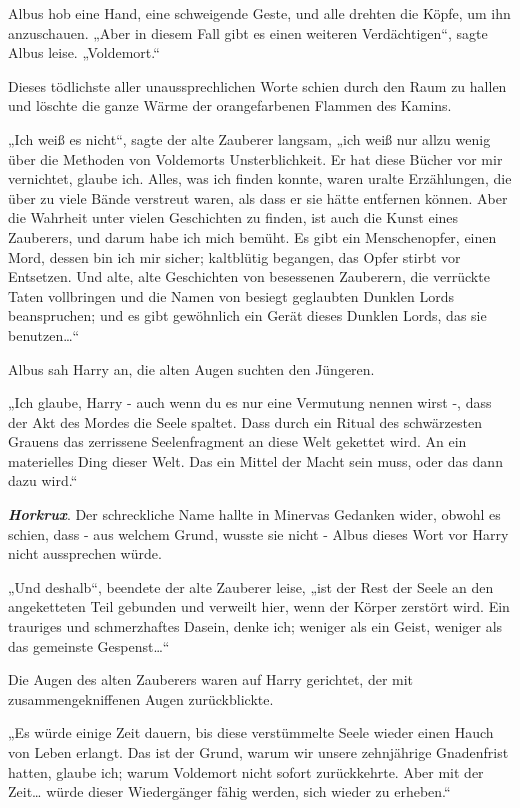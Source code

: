 {Albus hob eine Hand, eine schweigende Geste, und alle drehten die Köpfe, um ihn anzuschauen. „Aber in diesem Fall gibt es einen weiteren Verdächtigen“, sagte Albus leise. „Voldemort.“

Dieses tödlichste aller unaussprechlichen Worte schien durch den Raum zu hallen und löschte die ganze Wärme der orangefarbenen Flammen des Kamins.

„Ich weiß es nicht“, sagte der alte Zauberer langsam, „ich weiß nur allzu wenig über die Methoden von Voldemorts Unsterblichkeit. Er hat diese Bücher vor mir vernichtet, glaube ich. Alles, was ich finden konnte, waren uralte Erzählungen, die über zu viele Bände verstreut waren, als dass er sie hätte entfernen können. Aber die Wahrheit unter vielen Geschichten zu finden, ist auch die Kunst eines Zauberers, und darum habe ich mich bemüht. Es gibt ein Menschenopfer, einen Mord, dessen bin ich mir sicher; kaltblütig begangen, das Opfer stirbt vor Entsetzen. Und alte, alte Geschichten von besessenen Zauberern, die verrückte Taten vollbringen und die Namen von besiegt geglaubten Dunklen Lords beanspruchen; und es gibt gewöhnlich ein Gerät dieses Dunklen Lords, das sie benutzen…“

Albus sah Harry an, die alten Augen suchten den Jüngeren.

„Ich glaube, Harry - auch wenn du es nur eine Vermutung nennen wirst -, dass der Akt des Mordes die Seele spaltet. Dass durch ein Ritual des schwärzesten Grauens das zerrissene Seelenfragment an diese Welt gekettet wird. An ein materielles Ding dieser Welt. Das ein Mittel der Macht sein muss, oder das dann dazu wird.“

\textbf{\emph{Horkrux}}. Der schreckliche Name hallte in Minervas Gedanken wider, obwohl es schien, dass - aus welchem Grund, wusste sie nicht - Albus dieses Wort vor Harry nicht aussprechen würde.

„Und deshalb“, beendete der alte Zauberer leise, „ist der Rest der Seele an den angeketteten Teil gebunden und verweilt hier, wenn der Körper zerstört wird. Ein trauriges und schmerzhaftes Dasein, denke ich; weniger als ein Geist, weniger als das gemeinste Gespenst…“

Die Augen des alten Zauberers waren auf Harry gerichtet, der mit zusammengekniffenen Augen zurückblickte.

„Es würde einige Zeit dauern, bis diese verstümmelte Seele wieder einen Hauch von Leben erlangt. Das ist der Grund, warum wir unsere zehnjährige Gnadenfrist hatten, glaube ich; warum Voldemort nicht sofort zurückkehrte. Aber mit der Zeit… würde dieser Wiedergänger fähig werden, sich wieder zu erheben.“

}
